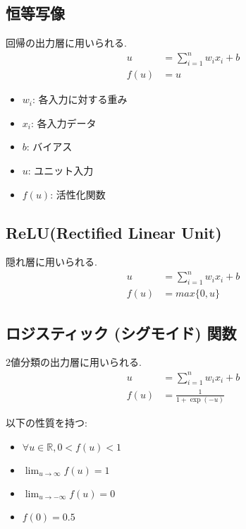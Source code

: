 \documentclass[dvipdfmx, 10pt]{jsarticle}
\begin{document}
\begin{oframed}

\subsection*{恒等写像}
回帰の出力層に用いられる. 
\begin{align*}
    u &= \sum_{i=1}^n w_i x_i + b \\
    f(u) &= u
\end{align*}
\begin{itemize}
    \item $w_i$: 各入力に対する重み
    \item $x_i$: 各入力データ
    \item $b$: バイアス
    \item $u$: ユニット入力
    \item $f(u)$: 活性化関数
\end{itemize}

\subsection*{ReLU(Rectified Linear Unit)}
隠れ層に用いられる. 
\begin{align*}
    u &= \sum_{i=1}^n w_i x_i + b \\
    f(u) &= max \{0, u\}
\end{align*}

\subsection*{ロジスティック (シグモイド) 関数}
2値分類の出力層に用いられる. 
\begin{align*}
    u &= \sum_{i=1}^n w_i x_i + b \\
    f(u) &= \frac{1}{1 + \exp(-u)}
\end{align*}

以下の性質を持つ: 
\begin{itemize}
    \item $\forall u \in \mathbb{R}, 0 < f(u) < 1$
    \item $\lim_{u\to \infty} f(u) = 1$
    \item $\lim_{u\to -\infty} f(u) = 0$
    \item $f(0) = 0.5$
\end{itemize}


\end{oframed}
\end{document}
